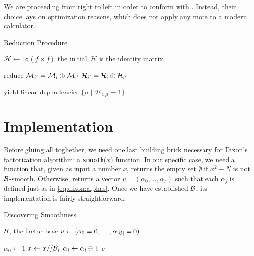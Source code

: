 \begin{remark}
  We are proceeding from right to left in order to conform with
  \cite{morrison-brillhart}.
  Instead, their choice lays on optimization reasons, which does
  not apply any more to a modern calculator.
\end{remark}

\begin{algorithm}
  \caption{Reduction Procedure  \label{alg:dixon:kernel}}
  \begin{algorithmic}[1]
    \State $\mathcal{H} \gets \texttt{Id}(f \times f)$
    \Comment the initial $\mathcal{H}$ is the identity matrix

    \Comment reduce
              \State $\mathcal{M}_{i'} = \mathcal{M}_i \oplus \mathcal{M}_{i'}$
              \State $\mathcal{H}_{i'} = \mathcal{H}_i \oplus \mathcal{H}_{i'}$
            \EndIf
          \EndFor
          \State {}
        \EndIf
      \EndFor
    \EndFor

    \Comment yield linear dependencies
         $\{\mu  \mid \mathcal{H}_{i,\mu} = 1\}$
      \EndIf
    \EndFor
    \EndFunction
  \end{algorithmic}
\end{algorithm}


\section{Implementation}

Before gluing all toghether, we need one last building brick necessary for
Dixon's factorization algorithm: a \texttt{smooth}($x$) function. In our
specific case, we need a function that, given as input a number $x$, returns the
empty set $\emptyset$ if $x^2 -N$ is not $\mathcal{B}$-smooth. Otherwise,
returns a vector $v = (\alpha_0, \ldots, \alpha_r)$ such that each $\alpha_j$ is
defined just as in \ref{eq:dixon:alphas}. Once we have established $\mathcal{B}$, its
implementation is fairly straightforward:

\begin{algorithm}
  \caption{Discovering Smoothness}
  \begin{algorithmic}[1]
    \Require $\mathcal{B}$, the factor base
      \State $v \gets (\alpha_0 = 0, \ldots, \alpha_{|\mathcal{B}|} = 0)$

       $\alpha_0 \gets 1$ \EndIf
          \EndIf
        \State $x \gets x// \mathcal{B}_i$
        \State $\alpha_i \gets \alpha_i \oplus 1$
      \EndFor
        \State \Return $v$
      \Else
        \State \Return {}
      \EndIf
    \EndProcedure
  \end{algorithmic}
\end{algorithm}
